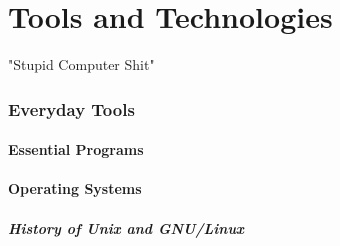 
\part*{Tools and Technologies}

"Stupid Computer Shit"


\toclineskip
\section{Everyday Tools}


\subsection{Essential Programs}



\subsection{Operating Systems}



\subsubsection{History of Unix and GNU/Linux}

